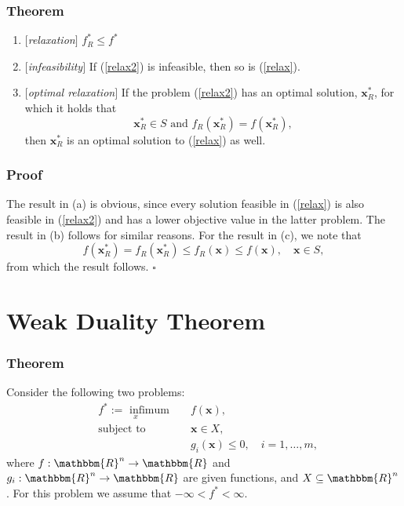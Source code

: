 \documentclass[12pt, a4paper]{article}
\begin{document}
\subsubsection*{Theorem}

\begin{enumerate}[label={(\alph*)}]
    \item $[$\textit{relaxation}$]$ $f_{R}^* \leq f^*$
    \item $[$\textit{infeasibility}$]$ If (\ref{relax2}) is infeasible, then so is (\ref{relax}).
    \item $[$\textit{optimal relaxation}$]$ If the problem (\ref{relax2}) has an optimal solution, $\bm{x}_{R}^*$, for which it holds that
    \begin{equation*}
     \bm{x}_{R}^*\in S \text{ and } f_{R}( \bm{x}_{R}^*) = f( \bm{x}_{R}^*),
    \end{equation*}
    then  $\bm{x}_{R}^*$ is an optimal solution to (\ref{relax}) as well.
\end{enumerate}

\subsubsection*{Proof}
The result in (a) is obvious, since every solution feasible in (\ref{relax}) is also feasible in (\ref{relax2}) and has a lower objective value in the latter problem. The result in (b) follows for similar reasons. For the result in (c), we note that
\begin{equation*}
f( \bm{x}_{R}^*) = f_R(\bm{x}_{R}^*) \leq f_R(\bm{x}) \leq f(\bm{x}), \quad \bm{x}\in S,
\end{equation*}
from which the result follows. $\square$

\section{Weak Duality Theorem}
\subsubsection*{Theorem}
Consider the following two problems:
\begin{equation}
\label{prob1}
\begin{aligned}
& \underset{x}{f^* := \text{ infimum }}
& & f(\bm{x}), \\
& \text{subject to}
& & \bm{x}\in X,\\
&&& g_i(\bm{x})\leq 0, \quad i=1,\dots,m,
\end{aligned}
\end{equation}
where $f : \mathbbm{R}^n \rightarrow \mathbbm{R}$ and $g_i : \mathbbm{R}^n \rightarrow \mathbbm{R}$ are given functions, and $X\subseteq\mathbbm{R}^n$. For this problem we assume that $-\infty < f^* < \infty$.
\end{document}
